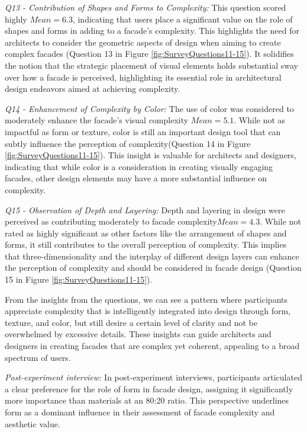 \textit{Q13 - Contribution of Shapes and Forms to Complexity:}
This question scored highly \(Mean=6.3\), indicating that users place a significant value on the role of shapes and forms in adding to a facade's complexity.
This highlights the need for architects to consider the geometric aspects of design when aiming to create complex facades (Question 13 in Figure \ref{fig:SurveyQuestions11-15}). It solidifies the notion that the strategic placement of visual elements holds substantial sway over how a facade is perceived, highlighting its essential role in architectural design endeavors aimed at achieving complexity.

\textit{Q14 - Enhancement of Complexity by Color:}
The use of color was considered to moderately enhance the facade's visual complexity \(Mean=5.1\).
While not as impactful as form or texture, color is still an important design tool that can subtly influence the perception of complexity(Question 14 in Figure \ref{fig:SurveyQuestions11-15}).
This insight is valuable for architects and designers, indicating that while color is a consideration in creating visually engaging facades, other design elements may have a more substantial influence on complexity.

\textit{Q15 - Observation of Depth and Layering:}
Depth and layering in design were perceived as contributing moderately to facade complexity\(Mean=4.3\).
While not rated as highly significant as other factors like the arrangement of shapes and forms, it still contributes to the overall perception of complexity.
This implies that three-dimensionality and the interplay of different design layers can enhance the perception of complexity and should be considered in facade design (Question 15 in Figure \ref{fig:SurveyQuestions11-15}).

From the insights from the questions, we can see a pattern where participants appreciate complexity that is intelligently integrated into design through form, texture, and color, but still desire a certain level of clarity and not be overwhelmed by excessive details.
These insights can guide architects and designers in creating facades that are complex yet coherent, appealing to a broad spectrum of users.

\textit{Post-experiment interview:}
In post-experiment interviews, participants articulated a clear preference for the role of form in facade design, assigning it significantly more importance than materials at an 80:20 ratio.
This perspective underlines form as a dominant influence in their assessment of facade complexity and aesthetic value.

